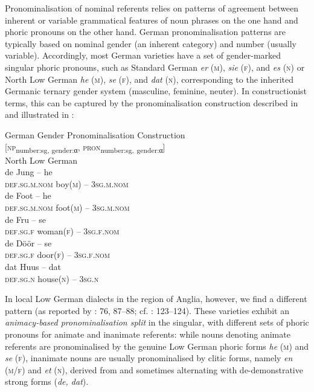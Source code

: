 \documentclass[output=paper]{langsci/langscibook}
\begin{document}
Pronominalisation of nominal referents relies on patterns of agreement between inherent or variable grammatical features of noun phrases on the one hand and phoric pronouns on the other hand. German pronominalisation patterns are typically based on nominal gender (an inherent category) and number (usually variable). Accordingly, most German varieties have a set of gender-marked singular phoric pronouns, such as Standard German \textit{er} (\textsc{m}), \textit{sie} (\textsc{f}), and \textit{es} (\textsc{n}) or North Low German \textit{he} (\textsc{m}), \textit{se} (\textsc{f}), and \textit{dat} (\textsc{n}), corresponding to the inherited Germanic ternary gender system (masculine, feminine, neuter). In constructionist terms, this can be captured by the pronominalisation construction described in  and illustrated in :

\ea
\label{ex:hoeder:10}
	German Gender Pronominalisation Construction\\
     {[}\textsc{np}\textsubscript{number:sg, gender:}\textsubscript{α}, \textsc{pron}\textsubscript{number:sg,} \textsubscript{gender:}\textsubscript{α}{]}\\
\ex \label{ex:hoeder:11}
	North Low German\\
	\ea\label{ex:hoeder:11a}	
	\gll de Jung – he\\
     \textsc{def.sg.m.nom}{} boy(\textsc{m}) – 3\textsc{sg.m.nom}\\
 
	\ex \label{ex:hoeder:11b}
	\gll de Foot – he\\
     \textsc{def.sg.m.nom}{} foot(\textsc{m}) – 3\textsc{sg.m.nom}\\
     
     \ex \label{ex:hoeder:11c}
	\gll de Fru – se\\
     \textsc{def.sg.f} woman(\textsc{f}) – 3\textsc{sg.f.nom}\\

	\ex \label{ex:hoeder:11d}
	\gll de Döör – se\\
     \textsc{def.sg.f} door(\textsc{f}) – 3\textsc{sg.f.nom}\\
     
     \ex \label{ex:hoeder:11e}
	\gll dat Huus – dat\\
     \textsc{def.sg.n}{} house(\textsc{n}) – 3\textsc{sg.n}\\
     
     \z
     \z
     
In local Low German dialects in the region of Anglia, however, we find a different pattern (as reported by \citealt{Bock.1933}: 76, 87–88; cf. \citealt{Hoder.2016a}: 123--124). These varieties exhibit an \textit{animacy-based pronominalisation split} in the singular, with different sets of phoric{} pronouns for animate and inanimate referents: while nouns denoting animate referents are pronominalised by the genuine Low German phoric forms \textit{he} (\textsc{m}) and \textit{se} (\textsc{f}), inanimate nouns are usually pronominalised by clitic forms, namely \textit{en} (\textsc{m/f}) and \textit{et} (\textsc{n}), derived from and sometimes alternating with de-demonstrative strong forms (\textit{de, dat}).
\end{document}
